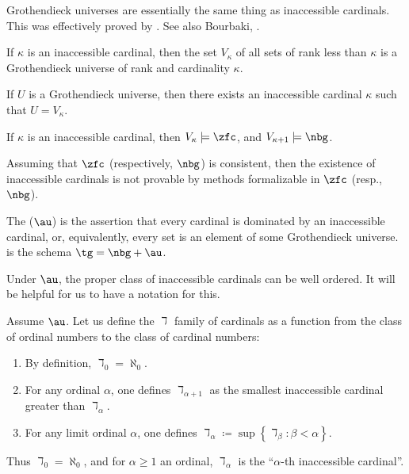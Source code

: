 Grothendieck universes are essentially the same thing as inaccessible cardinals.
This was effectively proved by \cite{Tarski1938}.
See also Bourbaki, \citeauthor[Exposé I, Appendix]{SGA4-1}.
\begin{proposition}
	If $\kappa$ is an inaccessible cardinal, then
	the set $V_{\kappa}$ of all sets of rank less than $\kappa$ is
	a Grothendieck universe of rank and cardinality $\kappa$.

	If $ U $ is a Grothendieck universe, then
	there exists an inaccessible cardinal $ \kappa $ such that $ U = V_{\kappa} $.
\end{proposition}

\begin{theorem}
	If $ \kappa $ is an inaccessible cardinal,
	then $V_{\kappa} \models \zfc $, and
	$ V_{\kappa+1} \models \nbg $.
	
	Assuming that $ \zfc $ (respectively, $ \nbg $) is consistent, then
	the existence of inaccessible cardinals is not provable
	by methods formalizable in $ \zfc $ (resp., $ \nbg $).
\end{theorem}

\begin{axiom}%
\label{axm:AU}
	The  ($ \au $) is the assertion that
	every cardinal is dominated by an inaccessible cardinal,
	or, equivalently, every set is an element of some Grothendieck universe.
	 is the schema $\tg = \nbg+\au$.
\end{axiom}

Under $ \au $, the proper class of inaccessible cardinals
can be well ordered.
It will be helpful for us to have a notation for this.

\begin{definition}
	Assume $ \au $.
	Let us define the $ \daleth $ family of cardinals
	as a function from the class of ordinal numbers
	to the class of cardinal numbers:
	\begin{enumerate}
		\item By definition, $ \daleth_0 = \aleph_0 $.
		\item For any ordinal $ \alpha $,
			one defines $ \daleth_{\alpha+1} $ as
			the smallest inaccessible cardinal 
			greater than $ \daleth_{\alpha} $.
		\item For any limit ordinal $ \alpha $,
			one defines
			$ \daleth_{\alpha} \coloneq \sup \left\{ \daleth_{\beta} :
			\beta < \alpha \right\} $.
	\end{enumerate}
	Thus $ \daleth_0 = \aleph_0 $, and
	for $ \alpha \geq 1$ an ordinal,
	$ \daleth_{\alpha} $ is the
	\enquote{$ \alpha $-th inaccessible cardinal}.
\end{definition}


